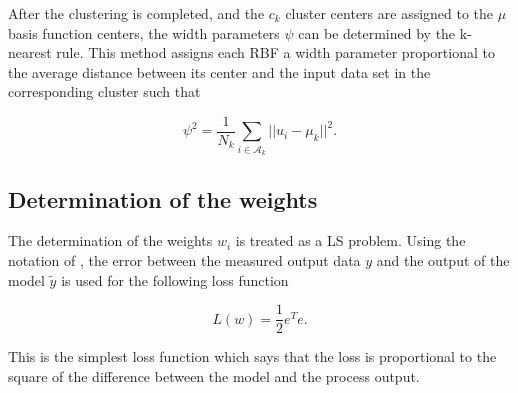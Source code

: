 After the clustering is completed, and the $c_k$ cluster centers are assigned to the $\mu$ basis function centers, the width parameters $\psi$ can be determined by the k-nearest rule. This method assigns each RBF a width parameter proportional to the average distance between its center and the input data set in the corresponding cluster such that 

 \begin{equation}
\label{cluster center}
\psi^2 = \frac{1}{N_k} \sum_{i \in \mathcal{A}_k}  ||u_i - \mu_k||^2.
\end{equation}

\subsection{Determination of the weights}
\label{determination_weights} 

The determination of the weights $w_i$ is treated as a LS problem. Using the notation of , the error between the measured output data $y$ and the output of the model $\tilde{y}$ is used for the following loss function

 \begin{equation}
\label{loss_function}
L(w) = \frac{1}{2} e^Te. 
\end{equation}

This is the simplest loss function which says that the loss is proportional to the square of the difference between the model and the process output. 
